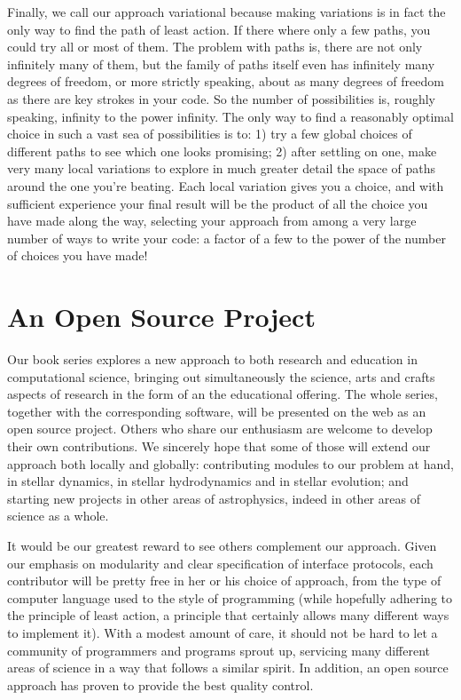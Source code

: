 Finally, we call our approach variational because making variations is
in fact the only way to find the path of least action.  If there where
only a few paths, you could try all or most of them.  The problem with
paths is, there are not only infinitely many of them, but the family
of paths itself even has infinitely many degrees of freedom, or more
strictly speaking, about as many degrees of freedom as there are key
strokes in your code.  So the number of possibilities is, roughly
speaking, infinity to the power infinity.  The only way to find a
reasonably optimal choice in such a vast sea of possibilities is to:
1) try a few global choices of different paths to see which one looks
promising; 2) after settling on one, make very many local variations
to explore in much greater detail the space of paths around the one
you're beating.  Each local variation gives you a choice, and with
sufficient experience your final result will be the product of all the
choice you have made along the way, selecting your approach from among
a very large number of ways to write your code: a factor of a few to
the power of the number of choices you have made!

\section*{An Open Source Project}

Our book series explores a new approach to both research and education
in computational science, bringing out simultaneously the science,
arts and crafts aspects of research in the form of an the educational
offering.  The whole series, together with the corresponding software,
will be presented on the web as an open source project.  Others who
share our enthusiasm are welcome to develop their own contributions.
We sincerely hope that some of those will extend our approach both
locally and globally: contributing modules to our problem at hand, in
stellar dynamics, in stellar hydrodynamics and in stellar evolution;
and starting new projects in other areas of astrophysics, indeed in
other areas of science as a whole.

It would be our greatest reward to see others complement our approach.
Given our emphasis on modularity and clear specification of interface
protocols, each contributor will be pretty free in her or his choice
of approach, from the type of computer language used to the style of
programming (while hopefully adhering to the principle of least action,
a principle that certainly allows many different ways to implement it).
With a modest amount of care, it should not be hard to let a community
of programmers and programs sprout up, servicing many different areas
of science in a way that follows a similar spirit.  In addition, an
open source approach has proven to provide the best quality control.

